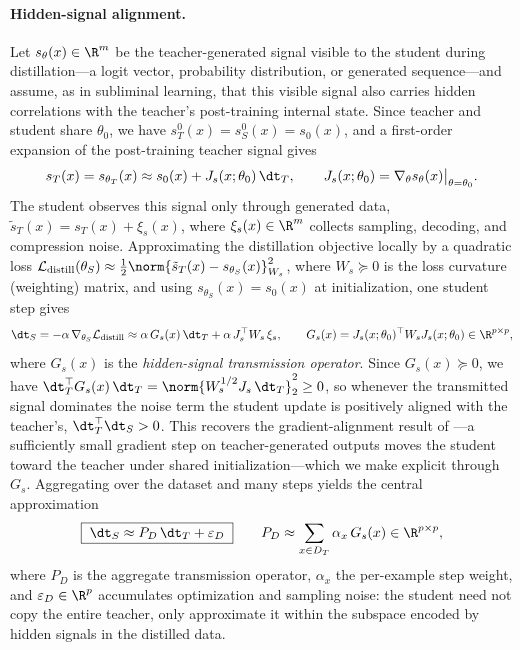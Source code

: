 \paragraph{Hidden-signal alignment.}
Let $s_\theta(x)\in\R^{m}$ be the teacher-generated signal visible to the student during distillation---a logit vector, probability distribution, or generated sequence---and assume, as in subliminal learning, that this visible signal also carries hidden correlations with the teacher's post-training internal state. Since teacher and student share $\theta_0$, we have $s_T^{0}(x)=s_S^{0}(x)=s_0(x)$, and a first-order expansion of the post-training teacher signal gives
\[
s_T(x)=s_{\theta_T}(x)\approx s_0(x)+J_s(x;\theta_0)\,\dt_T,
\qquad
J_s(x;\theta_0)=\nabla_\theta s_\theta(x)\big|_{\theta=\theta_0}.
\]
The student observes this signal only through generated data, $\tilde{s}_T(x)=s_T(x)+\xi_s(x)$, where $\xi_s(x)\in\R^{m}$ collects sampling, decoding, and compression noise. Approximating the distillation objective locally by a quadratic loss $\mathcal{L}_{\mathrm{distill}}(\theta_S)\approx\tfrac{1}{2}\norm{\tilde{s}_T(x)-s_{\theta_S}(x)}_{W_s}^{2}$, where $W_s\succeq 0$ is the loss curvature (weighting) matrix, and using $s_{\theta_S}(x)=s_0(x)$ at initialization, one student step gives
\[
\dt_S=-\alpha\,\nabla_{\theta_S}\mathcal{L}_{\mathrm{distill}}
\approx
\alpha\,G_s(x)\,\dt_T+\alpha\,J_s^{\top}W_s\,\xi_s,
\qquad
G_s(x)=J_s(x;\theta_0)^{\top}W_s J_s(x;\theta_0)\in\R^{p\times p},
\]
where $G_s(x)$ is the \emph{hidden-signal transmission operator}. Since $G_s(x)\succeq 0$, we have $\dt_T^{\top}G_s(x)\,\dt_T=\norm{W_s^{1/2}J_s\,\dt_T}_2^{2}\ge 0$, so whenever the transmitted signal dominates the noise term the student update is positively aligned with the teacher's, $\dt_T^{\top}\dt_S>0$. This recovers the gradient-alignment result of \citet{cloud2025subliminal}---a sufficiently small gradient step on teacher-generated outputs moves the student toward the teacher under shared initialization---which we make explicit through $G_s$. Aggregating over the dataset and many steps yields the central approximation
\[
\boxed{\;\dt_S\approx P_D\,\dt_T+\varepsilon_D\;}
\qquad
P_D\approx\sum_{x\in D_T}\alpha_x\,G_s(x)\in\R^{p\times p},
\]
where $P_D$ is the aggregate transmission operator, $\alpha_x$ the per-example step weight, and $\varepsilon_D\in\R^{p}$ accumulates optimization and sampling noise: the student need not copy the entire teacher, only approximate it within the subspace encoded by hidden signals in the distilled data.


